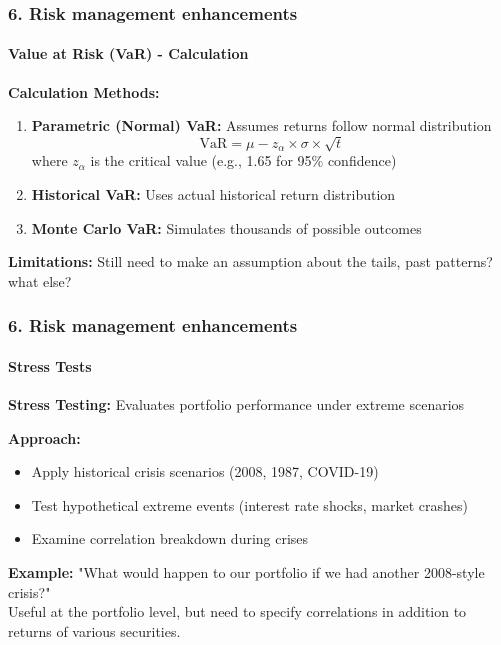 \documentclass{beamer}
\begin{document}
\begin{frame}[t]
    \frametitle{6. Risk management enhancements}
    \framesubtitle{Value at Risk (VaR) - Calculation }

    \textbf{Calculation Methods:}
    \begin{enumerate}
        \item \textbf{Parametric (Normal) VaR:} Assumes returns follow normal distribution
        $$\text{VaR} = \mu - z_\alpha \times \sigma \times \sqrt{t}$$
        where $z_\alpha$ is the critical value (e.g., 1.65 for 95\% confidence)
        
        \item \textbf{Historical VaR:} Uses actual historical return distribution
        
        \item \textbf{Monte Carlo VaR:} Simulates thousands of possible outcomes
    \end{enumerate}
    \vspace{0.5em}

    \textbf{Limitations:} Still need to make an assumption about the tails, past patterns? what else?

\end{frame}

\begin{frame}[t]
    \frametitle{6. Risk management enhancements}
    \framesubtitle{Stress Tests}

    \textbf{Stress Testing:} Evaluates portfolio performance under extreme scenarios
    \vspace{1em}

    \textbf{Approach:}
    \begin{itemize}
        \item Apply historical crisis scenarios (2008, 1987, COVID-19)
        \item Test hypothetical extreme events (interest rate shocks, market crashes)
        \item Examine correlation breakdown during crises
    \end{itemize}
    \vspace{1em}

    \textbf{Example:} "What would happen to our portfolio if we had another 2008-style crisis?"\\
    \vspace{1em}
    Useful at the portfolio level, but need to specify correlations in addition to returns of 
    various securities.

\end{frame}

 
\end{document}
